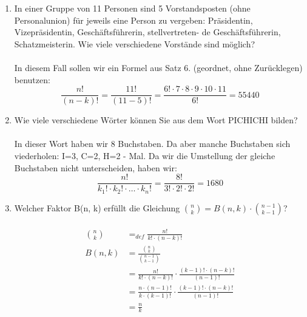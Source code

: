 \begin{enumerate}[label=(\alph*)]
        \item In einer Gruppe von 11 Personen sind 5 Vorstandsposten (ohne Personalunion) für jeweils
        eine Person zu vergeben: Präsidentin, Vizepräsidentin, Geschäftsführerin, stellvertreten-
        de Geschäftsführerin, Schatzmeisterin. Wie viele verschiedene Vorstände sind möglich?\\\\
        In diesem Fall sollen wir ein Formel aus Satz 6. (geordnet, ohne Zur\"ucklegen) benutzen:
        \[\frac{n!}{(n-k)!}=\frac{11!}{(11-5)!}
        =\frac{6!\cdot7\cdot8\cdot9\cdot10\cdot11}{6!}
        =55440\]

        \item Wie viele verschiedene Wörter können Sie aus dem Wort PICHICHI bilden?\\\\
        In dieser Wort haben wir 8 Buchstaben. Da aber manche Buchstaben sich viederholen: 
        I=3, C=2, H=2 - Mal. Da wir die Umstellung der gleiche Buchstaben nicht unterscheiden, haben wir:
        \[\frac{n!}{k_1!\cdot k_2!\cdot\ldots\cdot k_n!} = \frac{8!}{3!\cdot2!\cdot2!} = 1680\]

        \item Welcher Faktor B(n, k) erfüllt die Gleichung $\binom{n}{k} = B(n,k)\cdot\binom{n-1}{k-1}$?\\\\
        \begin{align*}
        \binom{n}{k} &=_{def} \frac{n!}{k!\cdot(n-k)!}\\
        B(n,k) &= \frac{\binom{n}{k}}{\binom{n-1}{k-1}}\\
        &= \frac{n!}{k!\cdot(n-k)!} \cdot \frac{(k-1)!\cdot(n-k)!}{(n-1)!}\\
        &= \frac{n\cdot(n-1)!}{k\cdot(k-1)!} \cdot \frac{(k-1)!\cdot(n-k)!}{(n-1)!}\\
        &= \frac{n}{k}
        \end{align*}
	\end{enumerate}
